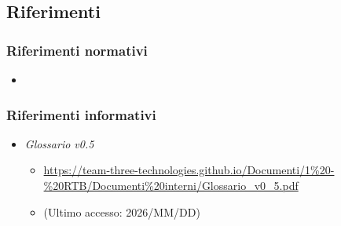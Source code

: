 \documentclass[a4paper,12pt]{article}
\begin{document}
{        \subsection{Riferimenti} {
            \subsubsection{Riferimenti normativi} {
                \begin{itemize}
                    \item
                \end{itemize}
            }
            \subsubsection{Riferimenti informativi} {
                \begin{itemize}
                    \item \textit{Glossario v0.5}
                    \begin{itemize}
                        \item \url{https://team-three-technologies.github.io/Documenti/1%20-%20RTB/Documenti%20interni/Glossario_v0_5.pdf}
                        \item[] (Ultimo accesso: 2026/MM/DD)
                    \end{itemize}
                \end{itemize}
            }
        }
    }
\end{document}
